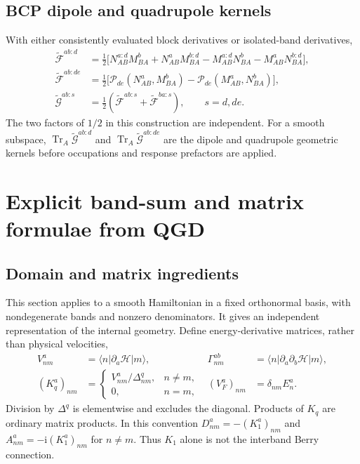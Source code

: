 \documentclass[prx,amsmath,amssymb,superscriptaddress,longbibliography]{revtex4-2}
\newcommand{\Tr}{\operatorname{Tr}}
\newcommand{\ii}{\mathrm{i}}
\begin{document}
\subsection{BCP dipole and quadrupole kernels}
With either consistently evaluated block derivatives or isolated-band derivatives,
\begin{align}
 \widetilde{\mathcal F}^{ab:d}
 &=\tfrac12\big[
 N_{AB}^{a:d}M_{BA}^b+N_{AB}^aM_{BA}^{b:d}
 -M_{AB}^{a:d}N_{BA}^b-M_{AB}^aN_{BA}^{b:d}\big],\label{eq:bcp-first}\\
 \widetilde{\mathcal F}^{ab:de}
 &=\tfrac12\big[\mathscr P_{de}(N_{AB}^a,M_{BA}^b)
                  -\mathscr P_{de}(M_{AB}^a,N_{BA}^b)\big],\label{eq:bcp-second}\\
 \widetilde{\mathcal G}^{ab:s}
 &=\tfrac12(\widetilde{\mathcal F}^{ab:s}
             +\widetilde{\mathcal F}^{ba:s}),\qquad s=d,de.
 \label{eq:bcp-sym}
\end{align}
The two factors of $1/2$ in this construction are independent.
For a smooth subspace, $\Tr_A\widetilde{\mathcal G}^{ab:d}$ and
$\Tr_A\widetilde{\mathcal G}^{ab:de}$ are the dipole and quadrupole
geometric kernels before occupations and response prefactors are applied.

\section{Explicit band-sum and matrix formulae from QGD}
\label{sec:qgd}

\subsection{Domain and matrix ingredients}
This section applies to a smooth Hamiltonian in a fixed orthonormal basis,
with nondegenerate bands and nonzero denominators.
It gives an independent representation of the internal geometry.
Define energy-derivative matrices, rather than physical velocities,
\begin{align}
 V_{nm}^a&=\langle n|\partial_a\mathcal H|m\rangle,
 &\Gamma_{nm}^{ab}&=\langle n|\partial_a\partial_b\mathcal H|m\rangle,
 \nonumber\\
 (K_q^a)_{nm}&=\begin{cases}V_{nm}^a/\Delta_{nm}^q,&n\ne m,\\0,&n=m,\end{cases}
 &(V_F^a)_{nm}&=\delta_{nm}E_n^a.
 \label{eq:qgd-ingredients}
\end{align}
Division by $\Delta^q$ is elementwise and excludes the diagonal.
Products of $K_q$ are ordinary matrix products.
In this convention $D_{nm}^a=-(K_1^a)_{nm}$ and
$A_{nm}^a=-\ii(K_1^a)_{nm}$ for $n\ne m$.
Thus $K_1$ alone is not the interband Berry connection.
\end{document}
